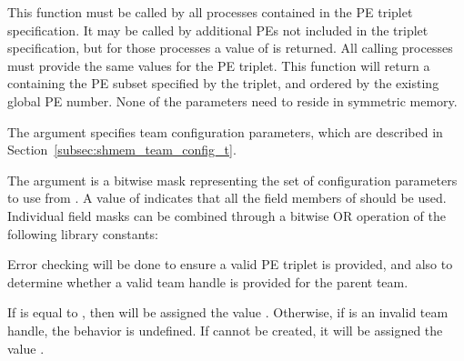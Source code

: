 \begin{apidefinition}
{This function must be called by all processes contained in the \ac{PE} triplet
specification. It may be called by additional \acp{PE} not included in the
triplet specification, but for those processes a  value of
 is returned. All calling processes must provide the
same values for the \ac{PE} triplet. This function will return a 
containing the \ac{PE} subset specified by the triplet, and ordered by the
existing global \ac{PE} number. None of the parameters need to reside in
symmetric memory.

The  argument specifies team configuration parameters, which are
described in Section~\ref{subsec:shmem_team_config_t}.

The  argument is a bitwise mask representing the set of
configuration parameters to use from .
A  value of  indicates that all the field members
of  should be used.
Individual field masks can be combined through a bitwise OR operation
of the following library constants:

{
}

Error checking will be done to ensure a valid \ac{PE} triplet is provided,
and also to determine whether a valid team handle is provided for the
parent team.

If  is equal to , then
 will be assigned the value .
Otherwise, if  is an invalid team handle,
the behavior is undefined.
If  cannot be created, it will be assigned the value
.
}



\begin{apiexamples}

\end{apiexamples}

\end{apidefinition}
